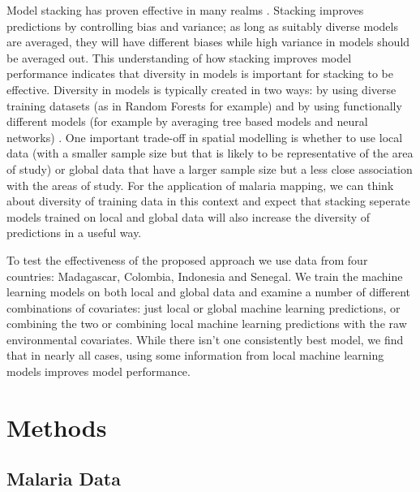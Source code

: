 \documentclass[review]{elsarticle}
\begin{document}
Model stacking \citep{wolpert1992stacked} has proven effective in many realms \citep{breiman1996stacked, sill2009feature, bhatt2017improved, hao2019review}. 
Stacking improves predictions by controlling bias and variance; as long as suitably diverse models are averaged, they will have different biases while high variance in models should be averaged out.
This understanding of how stacking improves model performance indicates that diversity in models is important for stacking to be effective.
Diversity in models is typically created in two ways: by using diverse training datasets\citep{breiman1996bagging} (as in Random Forests for example) and by using functionally different models (for example by averaging tree based models and neural networks) \citep{breiman1996stacked}.
One important trade-off in spatial modelling is whether to use local data (with a smaller sample size but that is likely to be representative of the area of study) or global data that have a larger sample size but a less close association with the areas of study.
For the application of malaria mapping, we can think about diversity of training data in this context and expect that stacking seperate models trained on local and global data will also increase the diversity of predictions in a useful way.


To test the effectiveness of the proposed approach we use data from four countries: Madagascar, Colombia, Indonesia and Senegal.
We train the machine learning models on both local and global data and examine a number of different combinations of covariates: just local or global machine learning predictions, or combining the two or combining local machine learning predictions with the raw environmental covariates.
While there isn't one consistently best model, we find that in nearly all cases, using some information from local machine learning models improves model performance.


\section{Methods}

\subsection{Malaria Data}
\end{document}
